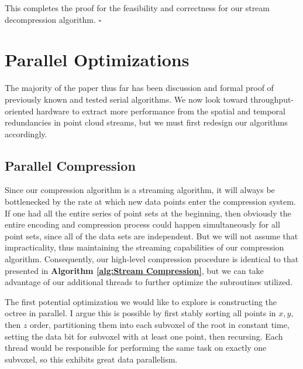 \documentclass[twoside,twocolumn]{article}
\begin{document}
This completes the proof for the feasibility and correctness for our stream decompression algorithm.
$\square$


\section{Parallel Optimizations} \label{sec:Parallel Optimizations}

The majority of the paper thus far has been discussion and formal proof of previously known and tested
serial algorithms. We now look toward throughput-oriented hardware to extract more performance from the
spatial and temporal redundancies in point cloud streams, but we must first redesign our algorithms
accordingly.


\subsection{Parallel Compression} \label{sec:Parallel Compression}

Since our compression algorithm is a streaming algorithm, it will always be bottlenecked by the rate at
which new data points enter the compression system. If one had all the entire series of point sets at the
beginning, then obviously the entire encoding and compression process could happen simultaneously for all
point sets, since all of the data sets are independent. But we will not assume that impracticality, thus
maintaining the streaming capabilities of our compression algorithm. Consequently, our high-level
compression procedure is identical to that presented in \textbf{Algorithm \ref{alg:Stream Compression}},
but we can take advantage of our additional threads to further optimize the subroutines utilized.

The first potential optimization we would like to explore is constructing the octree in parallel. I argue
this is possible by first stably sorting all points in $x,y,$ then $z$ order, partitioning them into each
subvoxel of the root in constant time, setting the data bit for subvoxel with at least one point, then
recursing. Each thread would be responsible for performing the same task on exactly one subvoxel, so
this exhibits great data parallelism.
\end{document}
